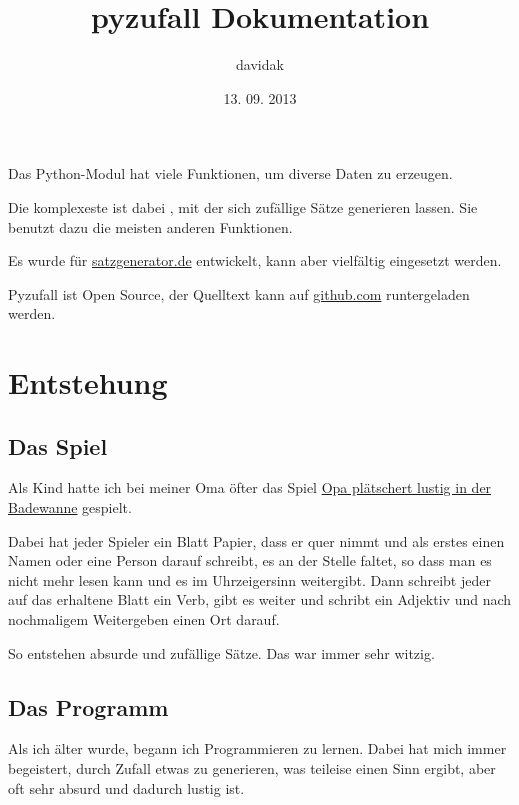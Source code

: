 \documentclass[a4paper,12pt,oneside]{sphinxmanual}
\title{pyzufall Dokumentation}
\date{13. 09. 2013}
\author{davidak}
\begin{document}
\maketitle
\tableofcontents
{}\label{index::doc}


Das Python-Modul  hat viele Funktionen, um diverse Daten zu erzeugen.

Die komplexeste ist dabei {\hyperref[module:module-pyzufall.satz]{}}, mit der sich zufällige Sätze generieren lassen. Sie benutzt dazu die meisten anderen Funktionen.

Es wurde für \href{http://satzgenerator.de/}{satzgenerator.de} entwickelt, kann aber vielfältig eingesetzt werden.

Pyzufall ist Open Source, der Quelltext kann auf \href{https://github.com/davidak/pyzufall/}{github.com} runtergeladen werden.


\chapter{Entstehung}
\label{entstehung::doc}\label{entstehung:entstehung}\label{entstehung:dokumentation-von-pyzufall}

\section{Das Spiel}
\label{entstehung:das-spiel}
Als Kind hatte ich bei meiner Oma öfter das Spiel \href{http://www.mama-tipps.de/tipp/Opa-plaetschert-Badewanne.html}{Opa plätschert lustig in der Badewanne} gespielt.

Dabei hat jeder Spieler ein Blatt Papier, dass er quer nimmt und als erstes einen Namen oder eine Person darauf schreibt, es an der Stelle faltet, so dass man es nicht mehr lesen kann und es im Uhrzeigersinn weitergibt. Dann schreibt jeder auf das erhaltene Blatt ein Verb, gibt es weiter und schribt ein Adjektiv und nach nochmaligem Weitergeben einen Ort darauf.

So entstehen absurde und zufällige Sätze. Das war immer sehr witzig.


\section{Das Programm}
\label{entstehung:das-programm}
Als ich älter wurde, begann ich Programmieren zu lernen. Dabei hat mich immer begeistert, durch Zufall etwas zu generieren, was teileise einen Sinn ergibt, aber oft sehr absurd und dadurch lustig ist.
\end{document}
